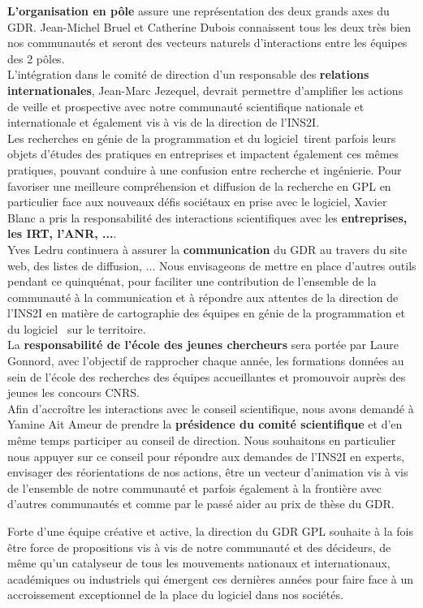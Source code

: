 \documentclass[11pt]{article}
\newcommand{\gpl}[0]{génie de la programmation et du logiciel}
\begin{document}
\textbf{L'organisation en pôle} assure une représentation des deux grands axes du GDR. Jean-Michel Bruel et Catherine Dubois connaissent tous les deux très bien nos communautés et seront des vecteurs naturels d'interactions entre les équipes des 2 pôles. \\
L'intégration dans le comité de direction d'un responsable des \textbf{relations internationales}, Jean-Marc Jezequel, devrait permettre d'amplifier les actions de veille et prospective avec notre communauté scientifique nationale et internationale et également vis à vis de la direction de l'INS2I. \\
Les recherches en \gpl~tirent parfois leurs objets d'études des pratiques en entreprises et impactent également ces mêmes pratiques, pouvant conduire à une confusion entre recherche et ingénierie. Pour favoriser une meilleure compréhension et diffusion de la recherche en GPL en particulier face aux nouveaux défis sociétaux en prise avec le logiciel, Xavier Blanc a pris la responsabilité des interactions scientifiques avec les \textbf{entreprises, les IRT, l'ANR, ...}.\\
Yves Ledru continuera à assurer la \textbf{communication } du GDR au travers du site web, des listes de diffusion, ... Nous envisageons de mettre en place d'autres outils pendant ce quinquénat, pour faciliter une contribution de l'ensemble de la communauté à la communication et à répondre aux attentes de la direction de l'INS2I en matière de cartographie des équipes en \gpl~ sur le territoire.\\
La \textbf{responsabilité de l'école des jeunes chercheurs} sera portée par Laure Gonnord, avec l'objectif de rapprocher chaque année, les formations données au sein de l'école des recherches des équipes accueillantes et promouvoir auprès des jeunes les concours CNRS. \\
Afin d'accroître les interactions avec le conseil scientifique, nous avons demandé à Yamine Ait Ameur de prendre la \textbf{présidence du comité scientifique} et d'en même temps participer au conseil de direction. Nous souhaitons en particulier nous appuyer sur ce conseil pour répondre aux demandes de l'INS2I en experts, envisager des réorientations de nos actions, être un vecteur d'animation vis à vis de l'ensemble de notre communauté et parfois également à la frontière avec d'autres communautés et comme par le passé aider au prix de thèse du GDR.



Forte d'une équipe créative et active, la direction du GDR GPL souhaite à la fois être force de propositions vis à vis de notre communauté et des décideurs, de même qu'un catalyseur de tous les mouvements nationaux et internationaux, académiques ou industriels qui émergent ces dernières années pour faire face à un accroissement exceptionnel de la place du logiciel dans nos sociétés.
\end{document}
